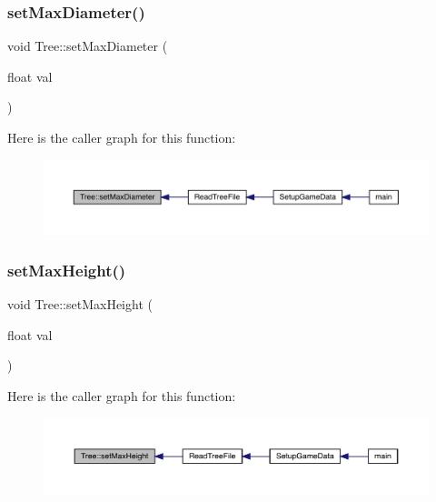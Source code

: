 \subsubsection{\texorpdfstring{set\+Max\+Diameter()}{setMaxDiameter()}}
{\footnotesize\ttfamily void Tree\+::set\+Max\+Diameter (\begin{DoxyParamCaption}\item[{float}]{val }\end{DoxyParamCaption})}

Here is the caller graph for this function\+:
\nopagebreak
\begin{figure}[H]
\begin{center}
\leavevmode
\includegraphics[width=350pt]{class_tree_a4073a7cc0b9b3388db7bff4491e96e72_icgraph}
\end{center}
\end{figure}
\mbox{\label{class_tree_afb29372db5251e9355aedd129e5d9a49}} 
\subsubsection{\texorpdfstring{set\+Max\+Height()}{setMaxHeight()}}
{\footnotesize\ttfamily void Tree\+::set\+Max\+Height (\begin{DoxyParamCaption}\item[{float}]{val }\end{DoxyParamCaption})}

Here is the caller graph for this function\+:
\nopagebreak
\begin{figure}[H]
\begin{center}
\leavevmode
\includegraphics[width=350pt]{class_tree_afb29372db5251e9355aedd129e5d9a49_icgraph}
\end{center}
\end{figure}


